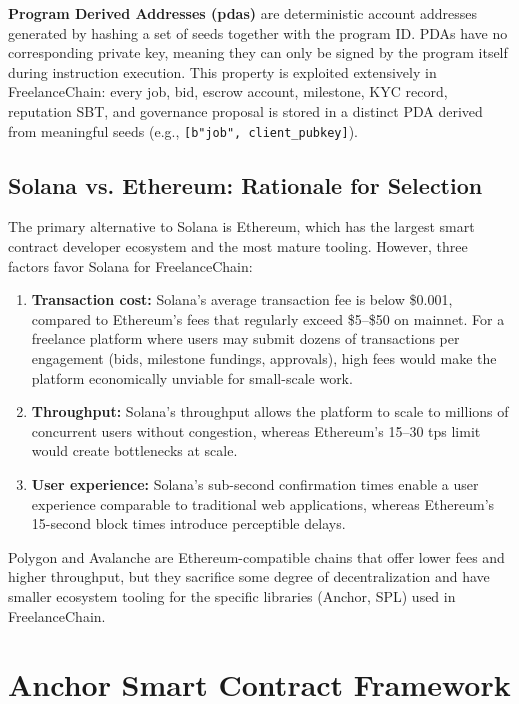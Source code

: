 \textbf{Program Derived Addresses (\gls{pda}s)} are deterministic account addresses generated by hashing a set of seeds together with the program ID. PDAs have no corresponding private key, meaning they can only be signed by the program itself during instruction execution. This property is exploited extensively in FreelanceChain: every job, bid, escrow account, milestone, KYC record, reputation SBT, and governance proposal is stored in a distinct PDA derived from meaningful seeds (e.g., \texttt{[b"job", client\_pubkey]}).

\subsection{Solana vs. Ethereum: Rationale for Selection}

The primary alternative to Solana is Ethereum, which has the largest smart contract developer ecosystem and the most mature tooling. However, three factors favor Solana for FreelanceChain:

\begin{enumerate}
    \item \textbf{Transaction cost:} Solana's average transaction fee is below \$0.001, compared to Ethereum's fees that regularly exceed \$5--\$50 on mainnet. For a freelance platform where users may submit dozens of transactions per engagement (bids, milestone fundings, approvals), high fees would make the platform economically unviable for small-scale work.
    \item \textbf{Throughput:} Solana's throughput allows the platform to scale to millions of concurrent users without congestion, whereas Ethereum's 15--30 \gls{tps} limit would create bottlenecks at scale.
    \item \textbf{User experience:} Solana's sub-second confirmation times enable a user experience comparable to traditional web applications, whereas Ethereum's 15-second block times introduce perceptible delays.
\end{enumerate}

Polygon and Avalanche are Ethereum-compatible chains that offer lower fees and higher throughput, but they sacrifice some degree of decentralization and have smaller ecosystem tooling for the specific libraries (Anchor, SPL) used in FreelanceChain.

\section{Anchor Smart Contract Framework}
\label{section:3.2}

